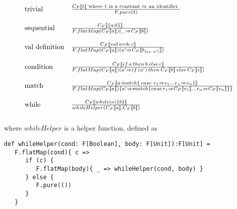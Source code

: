 \documentclass{llncs}
\begin{document}
$$
\begin{array}{ l l }\\
   \text{trivial}  &  \frac{ C_F \llbracket t \llbracket  \textrm{ where  $t$ ia a constant or an identifier }} { F.pure(t) } \\
\\
   \text{sequential} & \frac{ C_F \llbracket \{a;b\} \rrbracket }
                                        { F.flatMap(C_F \llbracket a \rrbracket )(\_ \Rightarrow C_F \llbracket b \rrbracket ) } \\
\\
   \text{val definition} & \frac{ C_F \llbracket {val\,a = b;\, c} \rrbracket}
                                            { F.flatMap(C_F \llbracket a \rrbracket )(a' \Rightarrow C_F \llbracket b_{[a \leftarrow a']} \rrbracket) } \\
\\
   \text{condition} & \frac{ C_F \llbracket if\,a\,then\,b\,else\,c \rrbracket }
                       { F.flatMap(C_F \llbracket a \rrbracket)(a' \Rightarrow if\,(a')\,then\,C_F \llbracket b \rrbracket \,else\,C_F \llbracket c \rrbracket ) } \\
\\
   \text{match} & \frac{ C_F \llbracket a\,match\{\,case\,\, r_1 \Rightarrow v_1 \dots r_n \Rightarrow v_n\} \rrbracket }
     {F.flatMap(C_F \llbracket a \rrbracket)\{a' \Rightarrow 
         match\{ case\, r_1 \Rightarrow C_F \llbracket v_1 \rrbracket \dots r_n \Rightarrow C_F \llbracket v_n \rrbracket \} \} } \\
\\
 \text{while} & \frac{C_F \llbracket while(a)\{ b \} \rrbracket }
                              {whileHelper(C_F \llbracket a \rrbracket ,C_F \llbracket b \rrbracket )} \\
 \\
\end{array}
$$
 where $whileHelper$ is a helper function, defined as 
\begin{lstlisting}
def whileHelper(cond: F[Boolean], body: F[Unit]):F[Unit] =
   F.flatMap(cond){ c =>
      if (c) {
         F.flatMap(body){ _ => whileHelper(cond, body) }
      } else {
         F.pure(())
      }
   }
\end{lstlisting}
 
\end{document}
